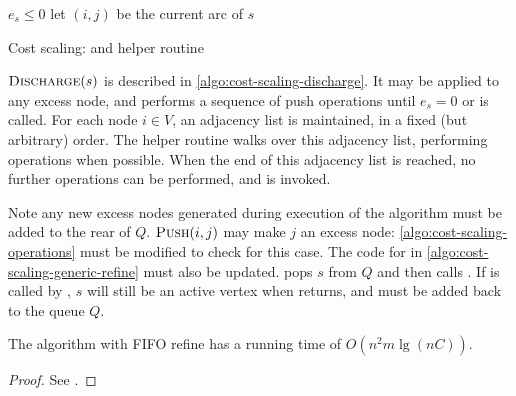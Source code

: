 \begin{algorithm}
\begin{algorithmic}[1]
        \Repeat
            \State {}
        \Until $e_s \leq 0$
    \EndFunction
    \setcounter{ALG@line}{0}
    \Statex
        \State let $(i,j)$ be the current arc of $s$
         
        \Else
                \State {}
            \Else
            \EndIf
        \EndIf
    \EndFunction
\end{algorithmic}
\caption{Cost scaling:  and helper routine }
\label{algo:cost-scaling-discharge}
\end{algorithm}

$\textproc{Discharge}(s)$ is described in \cref{algo:cost-scaling-discharge}. It may be applied to any excess node, and performs a sequence of push operations until $e_s = 0$ or  is called. For each node $i \in V$, an adjacency list is maintained, in a fixed (but arbitrary) order. The helper routine  walks over this adjacency list, performing  operations when possible. When the end of this adjacency list is reached, no further  operations can be performed, and  is invoked.

Note any new excess nodes generated during execution of the algorithm must be added to the rear of $Q$. $\textproc{Push}(i,j)$ may make $j$ an excess node: \cref{algo:cost-scaling-operations} must be modified to check for this case. The code for  in \cref{algo:cost-scaling-generic-refine} must also be updated.  pops $s$ from $Q$ and then calls . If  is called by , $s$ will still be an active vertex when  returns, and must be added back to the queue $Q$.\\

\begin{thm} \label{thm:cost-scaling-first-active-complexity}
The algorithm with FIFO refine has a running time of $O(n^2m \lg (nC))$.
\end{thm}
\begin{proof}
See \cite[theorem~6.2]{Goldberg:1990}.
\end{proof}

